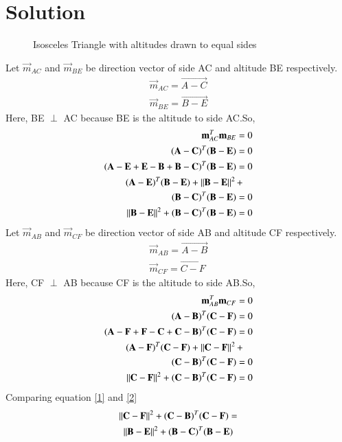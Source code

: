 \documentclass[journal,12pt,twocolumn]{IEEEtran}
\begin{document}
 \section{Solution}
\renewcommand{\thefigure}{1}
\renewcommand{\thefigure}{1}
\begin{figure}[!h]
\centering
\resizebox{\columnwidth}{!}{}
\caption{Isosceles Triangle with altitudes drawn to equal sides}
\label{myfig}
\end{figure}
 Let $\vec{m}_{AC}$ and $\vec{m}_{BE}$ be direction vector of side AC and altitude BE respectively.
 \begin{align}
 \vec{m}_{AC}=\vec{A-C}\\
 \vec{m}_{BE}=\vec{B-E}
 \end{align}
Here, BE  $\perp$ AC because BE is the altitude to side AC.So,
 \begin{align}
 \vec{m}_{AC}^{T}\vec{m}_{BE}=0\\
 \vec{(A-C)}^T\vec{(B-E)}=0\label{2.0.4}\\
  \vec{(A-E+E-B+B-C)}^T\vec{(B-E)}=0\\
 \begin{multlined}
\vec{(A-E)}^T\vec{(B-E)}+\norm{\vec{B-E}}^2+\\ \vec{(B-C)}^T\vec{(B-E)}=0\end{multlined}\\
\norm{\vec{B-E}}^2+\vec{(B-C)}^T\vec{(B-E)}=0 \label{2}
\end{align}
 Let $\vec{m}_{AB}$ and $\vec{m}_{CF}$ be direction vector of side AB and altitude CF respectively.
 \begin{align}
 \vec{m}_{AB}=\vec{A-B}\\
 \vec{m}_{CF}=\vec{C-F}
 \end{align}
 Here, CF  $\perp$ AB because CF is the altitude to side AB.So,
 \begin{align}
 \vec{m}_{AB}^T\vec{m}_{CF}=0\\
 \vec{(A-B)}^T\vec{(C-F)}=0\\
\vec{(A-F+F-C+C-B)}^T\vec{(C-F)}=0\\
\begin{multlined}
 \vec{(A-F)}^T\vec{(C-F)}+\norm{\vec{C-F}}^2+\\ \vec{(C-B)}^T\vec{(C-F)}=0\end{multlined}\\
\norm{\vec{C-F}}^2+\vec{(C-B)}^T\vec{(C-F)}=0\label{1}
 \end{align}
 Comparing equation \eqref{1} and \eqref{2}
\begin{multline}
\left\lVert\mathbf{C-F}\right\rVert^2+\mathbf{(C-B)}^T\mathbf{(C-F)}=\\\left\lVert\mathbf{B-E}\right\rVert^2+\mathbf{(B-C)}^T\mathbf{(B-E)}
\end{multline}
\end{document}
